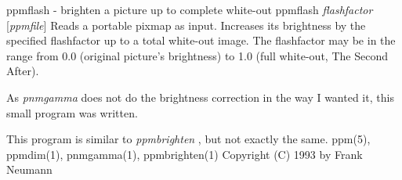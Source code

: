 ppmflash - brighten a picture up to complete white-out
ppmflash 
{\it flashfactor}
{\rm [}{\it ppmfile}{\rm ]}
Reads a portable pixmap as input. Increases its brightness by
the specified flashfactor up to a total white-out image.
The flashfactor may be in the range from 0.0 (original picture's
brightness) to 1.0 (full white-out, The Second After).
\par
As
{\it pnmgamma}
does not do the brightness correction in the way I
wanted it, this small program was written.
\par
This program is similar to
{\it ppmbrighten}
, but not exactly the same.
ppm(5), ppmdim(1), pnmgamma(1), ppmbrighten(1)
Copyright (C) 1993 by Frank Neumann
%

%

\newpage
%

